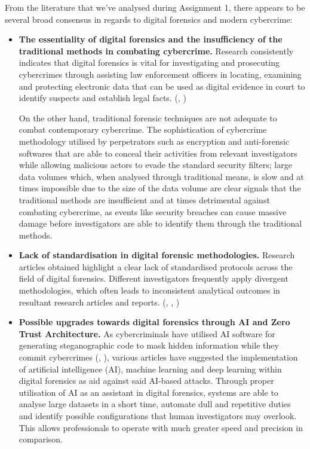 \documentclass[a4paper]{report}
\begin{document}
\begin{justify}
From the literature that we’ve analysed during Assignment 1, there appears to be several broad consensus in regards to digital forensics and modern cybercrime:

\begin{itemize}
\item \textbf{The essentiality of digital forensics and the insufficiency of the traditional methods in combating cybercrime.} Research consistently indicates that digital forensics is vital for investigating and prosecuting cybercrimes through assisting law enforcement officers in locating, examining and protecting electronic data that can be used as digital evidence in court to identify suspects and establish legal facts. (\cite{arif2025unveiling}, \cite{ilyas2024role})

On the other hand, traditional forensic techniques are not adequate to combat contemporary cybercrime. The sophistication of cybercrime methodology utilised by perpetrators such as encryption and anti-forensic softwares that are able to conceal their activities from relevant investigators while allowing malicious actors to evade the standard security filters; large data volumes which, when analysed through traditional means, is slow and at times impossible due to the size of the data volume are clear signals that the traditional methods are insufficient and at times detrimental against combating cybercrime, as events like security breaches can cause massive damage before investigators are able to identify them through the traditional methods.

\item \textbf{Lack of standardisation in digital forensic methodologies.} Research articles obtained highlight a clear lack of standardised protocols across the field of digital forensics. Different investigators frequently apply divergent methodologies, which often leads to inconsistent analytical outcomes in resultant research articles and reports. (\cite{ilyas2024role}, \cite{arif2025unveiling}, \cite{sharma2024digital})

\item \textbf{Possible upgrades towards digital forensics through AI and Zero Trust Architecture.} As cybercriminals have utilised AI software for generating steganographic code to mask hidden information while they commit cybercrimes (\cite{osamor2026comprehensive}, \cite{sanna2025improving}), various articles have suggested the implementation of artificial intelligence (AI), machine learning and deep learning within digital forensics as aid against said AI-based attacks. Through proper utilisation of AI as an assistant in digital forensics, systems are able to analyse large datasets in a short time, automate dull and repetitive duties and identify possible configurations that human investigators may overlook. This allows professionals to operate with much greater speed and precision in comparison.


\end{itemize}
\end{justify}
\end{document}
